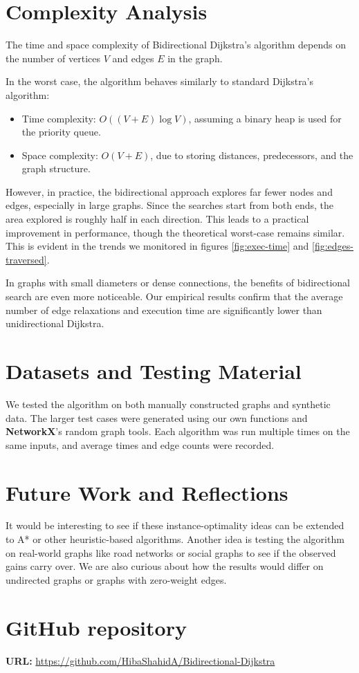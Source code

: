 \documentclass[12pt]{article}
\begin{document}
\section{Complexity Analysis}
The time and space complexity of Bidirectional Dijkstra’s algorithm depends on the number of vertices \( V \) and edges \( E \) in the graph.

In the worst case, the algorithm behaves similarly to standard Dijkstra's algorithm:
\begin{itemize}
    \item Time complexity: \( O((V + E) \log V) \), assuming a binary heap is used for the priority queue.
    \item Space complexity: \( O(V + E) \), due to storing distances, predecessors, and the graph structure.
\end{itemize}

However, in practice, the bidirectional approach explores far fewer nodes and edges, especially in large graphs. Since the searches start from both ends, the area explored is roughly half in each direction. This leads to a practical improvement in performance, though the theoretical worst-case remains similar. This is evident in the trends we monitored in figures \ref{fig:exec-time} and \ref{fig:edges-traversed}.

In graphs with small diameters or dense connections, the benefits of bidirectional search are even more noticeable. Our empirical results confirm that the average number of edge relaxations and execution time are significantly lower than unidirectional Dijkstra.

\section{Datasets and Testing Material}
We tested the algorithm on both manually constructed graphs and synthetic data. The larger test cases were generated using our own functions and \textbf{NetworkX}’s random graph tools. Each algorithm was run multiple times on the same inputs, and average times and edge counts were recorded.

\section{Future Work and Reflections}
It would be interesting to see if these instance-optimality ideas can be extended to A* or other heuristic-based algorithms. Another idea is testing the algorithm on real-world graphs like road networks or social graphs to see if the observed gains carry over. We are also curious about how the results would differ on undirected graphs or graphs with zero-weight edges.

\section{GitHub repository}
\textbf{URL:} \url{https://github.com/HibaShahidA/Bidirectional-Dijkstra}
\end{document}
